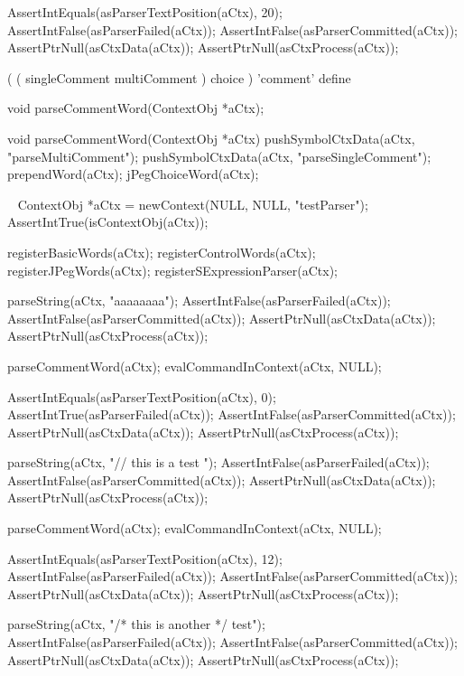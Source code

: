   AssertIntEquals(asParserTextPosition(aCtx), 20);
  AssertIntFalse(asParserFailed(aCtx));
  AssertIntFalse(asParserCommitted(aCtx));
  AssertPtrNull(asCtxData(aCtx));
  AssertPtrNull(asCtxProcess(aCtx));
\stopCTest
\stopTestCase
\stopTestSuite

\startTestSuite[parseCommentWord]

\starttyping
(
  ( singleComment multiComment ) choice
) 'comment' define
\stoptyping

\startCHeader
void parseCommentWord(ContextObj *aCtx);
\stopCHeader

\startCCode
void parseCommentWord(ContextObj *aCtx) {
  pushSymbolCtxData(aCtx, "parseMultiComment");
  pushSymbolCtxData(aCtx, "parseSingleComment");
  prependWord(aCtx);
  jPegChoiceWord(aCtx);
}
\stopCCode

\CTestsSuiteSetup\
\startCTest
  ContextObj *aCtx = newContext(NULL, NULL, "testParser");
  AssertIntTrue(isContextObj(aCtx));
  
  registerBasicWords(aCtx);
  registerControlWords(aCtx);
  registerJPegWords(aCtx);
  registerSExpressionParser(aCtx);
\stopCTest

\startCTest
  parseString(aCtx, "aaaaaaaa");
  AssertIntFalse(asParserFailed(aCtx));
  AssertIntFalse(asParserCommitted(aCtx));
  AssertPtrNull(asCtxData(aCtx));
  AssertPtrNull(asCtxProcess(aCtx));
  
  parseCommentWord(aCtx);
  evalCommandInContext(aCtx, NULL);
  
  AssertIntEquals(asParserTextPosition(aCtx), 0);
  AssertIntTrue(asParserFailed(aCtx));
  AssertIntFalse(asParserCommitted(aCtx));
  AssertPtrNull(asCtxData(aCtx));
  AssertPtrNull(asCtxProcess(aCtx));
\stopCTest
\stopTestCase

\startCTest
  parseString(aCtx, "// this is \n a test ");
  AssertIntFalse(asParserFailed(aCtx));
  AssertIntFalse(asParserCommitted(aCtx));
  AssertPtrNull(asCtxData(aCtx));
  AssertPtrNull(asCtxProcess(aCtx));
  
  parseCommentWord(aCtx);
  evalCommandInContext(aCtx, NULL);
  
  AssertIntEquals(asParserTextPosition(aCtx), 12);
  AssertIntFalse(asParserFailed(aCtx));
  AssertIntFalse(asParserCommitted(aCtx));
  AssertPtrNull(asCtxData(aCtx));
  AssertPtrNull(asCtxProcess(aCtx));
  
  parseString(aCtx, "/* this is \n another  */ test");
  AssertIntFalse(asParserFailed(aCtx));
  AssertIntFalse(asParserCommitted(aCtx));
  AssertPtrNull(asCtxData(aCtx));
  AssertPtrNull(asCtxProcess(aCtx));
  
